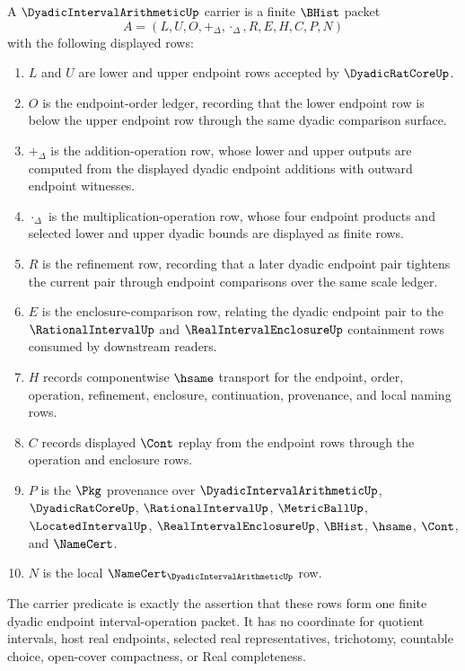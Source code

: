 \begin{definition}
\label{def:dyadic-interval-arithmetic-carrier}
A $\DyadicIntervalArithmeticUp$ carrier is a finite $\BHist$ packet
$$
A=(L,U,O,+_\Delta,\cdot_\Delta,R,E,H,C,P,N)
$$
with the following displayed rows:
\begin{enumerate}
\item $L$ and $U$ are lower and upper endpoint rows accepted by $\DyadicRatCoreUp$.
\item $O$ is the endpoint-order ledger, recording that the lower endpoint row is below the upper endpoint row through the same dyadic comparison surface.
\item $+_\Delta$ is the addition-operation row, whose lower and upper outputs are computed from the displayed dyadic endpoint additions with outward endpoint witnesses.
\item $\cdot_\Delta$ is the multiplication-operation row, whose four endpoint products and selected lower and upper dyadic bounds are displayed as finite rows.
\item $R$ is the refinement row, recording that a later dyadic endpoint pair tightens the current pair through endpoint comparisons over the same scale ledger.
\item $E$ is the enclosure-comparison row, relating the dyadic endpoint pair to the $\RationalIntervalUp$ and $\RealIntervalEnclosureUp$ containment rows consumed by downstream readers.
\item $H$ records componentwise $\hsame$ transport for the endpoint, order, operation, refinement, enclosure, continuation, provenance, and local naming rows.
\item $C$ records displayed $\Cont$ replay from the endpoint rows through the operation and enclosure rows.
\item $P$ is the $\Pkg$ provenance over $\DyadicIntervalArithmeticUp$, $\DyadicRatCoreUp$, $\RationalIntervalUp$, $\MetricBallUp$, $\LocatedIntervalUp$, $\RealIntervalEnclosureUp$, $\BHist$, $\hsame$, $\Cont$, and $\NameCert$.
\item $N$ is the local $\NameCert_{\DyadicIntervalArithmeticUp}$ row.
\end{enumerate}
The carrier predicate is exactly the assertion that these rows form one finite dyadic endpoint interval-operation packet. It has no coordinate for quotient intervals, host real endpoints, selected real representatives, trichotomy, countable choice, open-cover compactness, or Real completeness.
\end{definition}

